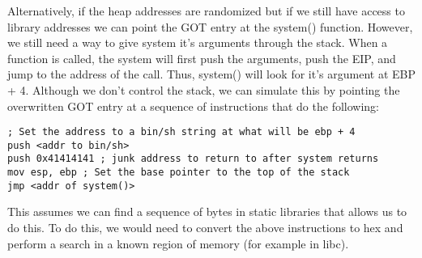 \documentclass[12pt]{article}
\begin{document}
Alternatively, if the heap addresses are randomized but if we still have access to library addresses we can point the GOT entry at the system() function. However, we still need a way to give system it's arguments through the stack. When a function is called, the system will first push the arguments, push the EIP, and jump to the address of the call. Thus, system() will look for it's argument at EBP + 4. Although we don't control the stack, we can simulate this by pointing the overwritten GOT entry at a sequence of instructions that do the following:

\begin{lstlisting}[language={[x86masm]Assembler}]
; Set the address to a bin/sh string at what will be ebp + 4
push <addr to bin/sh>
push 0x41414141 ; junk address to return to after system returns
mov esp, ebp ; Set the base pointer to the top of the stack
jmp <addr of system()>
\end{lstlisting}

This assumes we can find a sequence of bytes in static libraries that allows us to do this. To do this, we would need to convert the above instructions to hex and perform a search in a known region of memory (for example in libc). 
\end{document}
